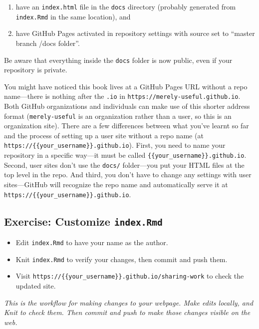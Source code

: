 \documentclass[]{Nemilov}
\providecommand{\tightlist}{%
  \setlength{\itemsep}{0pt}\setlength{\parskip}{0pt}}
\begin{document}
\begin{enumerate}
\def\labelenumi{\arabic{enumi}.}
\tightlist
\item
  have an \texttt{index.html} file in the \texttt{docs} directory (probably generated from \texttt{index.Rmd} in the same location), and
\item
  have GitHub Pages activated in repository settings with source set to ``master branch /docs folder''.
\end{enumerate}

Be aware that everything inside the \texttt{docs} folder is now public, even if your repository is private.

You might have noticed this book lives at a GitHub Pages URL without a repo name---there is nothing after the \texttt{.io} in \texttt{https://merely-useful.github.io}. Both GitHub organizations and individuals can make use of this shorter address format (\texttt{merely-useful} is an organization rather than a user, so this is an organization site). There are a few differences between what you've learnt so far and the process of setting up a user site without a repo name (at \texttt{https://\{\{your\_username\}\}.github.io}). First, you need to name your repository in a specific way---it must be called \texttt{\{\{your\_username\}\}.github.io}. Second, user sites don't use the \texttt{docs/} folder---you put your HTML files at the top level in the repo. And third, you don't have to change any settings with user sites---GitHub will recognize the repo name and automatically serve it at \texttt{https://\{\{your\_username\}\}.github.io}.

\hypertarget{exercise-customize-index.rmd}{%
\subsection{\texorpdfstring{Exercise: Customize \texttt{index.Rmd}}{Exercise: Customize index.Rmd}}\label{exercise-customize-index.rmd}}

\begin{itemize}
\item
  Edit \texttt{index.Rmd} to have your name as the author.
\item
  Knit \texttt{index.Rmd} to verify your changes, then commit and push them.
\item
  Visit \texttt{https://\{\{your\_username\}\}.github.io/sharing-work} to check the updated site.
\end{itemize}

\emph{This is the workflow for making changes to your webpage. Make edits locally, and Knit to check them. Then commit and push to make those changes visible on the web.}
\end{document}
